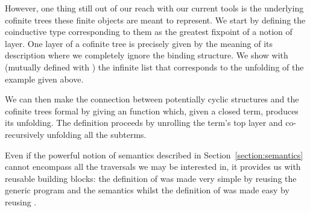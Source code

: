 \begin{agdasnippet}
\end{agdasnippet}


However, one thing still out of our reach with our current tools is
the underlying cofinite trees these finite objects are meant to
represent. We start by defining the coinductive type corresponding to
them as the greatest fixpoint of a notion of layer. One layer of a
cofinite tree is precisely given by the meaning of its description
where we completely ignore the binding structure. We show with
 (mutually defined with ) the infinite list that
corresponds to the unfolding of the example  given above.


\noindent
\begin{minipage}{\textwidth}
  \newline
\begin{minipage}{0.5\textwidth}
\end{minipage}
\begin{minipage}{0.49\textwidth}
\end{minipage}
\end{minipage}

We can then make the connection between potentially cyclic
structures and the cofinite trees formal by giving an 
function which, given a closed term, produces its unfolding.
The definition proceeds by unrolling the term's top layer and
co-recursively unfolding all the subterms.

\begin{agdasnippet}
\end{agdasnippet}

Even if the
powerful notion of semantics described in Section~\ref{section:semantics}
cannot encompass all the traversals we may be interested in,
it provides us with reusable building blocks: the definition
of  was made very simple by reusing the generic
program  and the  semantics whilst
the definition of  was made easy by reusing .
